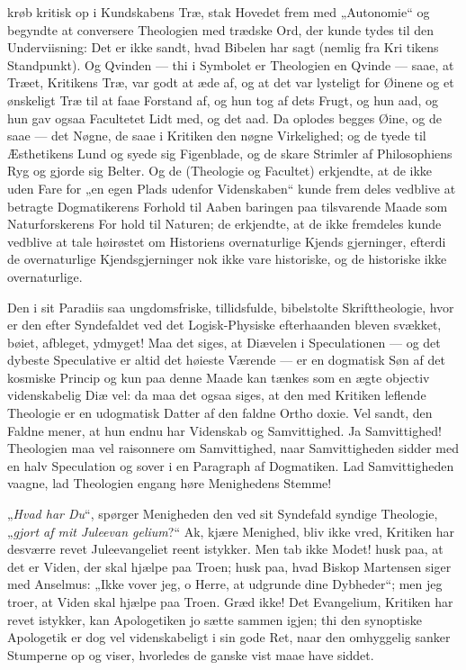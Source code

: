 \documentclass[12pt]{book}
\newcommand{\opage}[1]{\marginnote{\footnotesize\textit{[#1]}}}
\begin{document}
krøb kritisk op i Kundskabens Træ, stak Hovedet frem
med „Autonomie“ og begyndte at conversere Theologien
med trædske Ord, der kunde tydes til den Underviisning:
Det er ikke sandt, hvad Bibelen har sagt (nemlig fra Kri\-%
tikens Standpunkt). Og Qvinden --- thi i Symbolet er
Theologien en Qvinde --- saae, at Træet, Kritikens Træ,
var godt at æde af, og at det var lysteligt for Øinene og et
ønskeligt Træ til at faae Forstand af, og hun tog af dets
Frugt, og hun aad, og hun gav ogsaa Facultetet Lidt
med, og det aad. Da oplodes begges Øine, og de saae ---
det Nøgne, de saae i Kritiken den nøgne Virkelighed; og de
tyede til Æsthetikens Lund og syede sig Figenblade, og de
skare Strimler af Philosophiens Ryg og gjorde sig Belter.
Og de (Theologie og Facultet) erkjendte, at de ikke uden
Fare for „en egen Plads udenfor Videnskaben“ kunde frem\-%
deles vedblive at betragte Dogmatikerens Forhold til Aaben\-%
baringen paa tilsvarende Maade som Naturforskerens For\-%
hold til Naturen; de erkjendte, at de ikke fremdeles kunde
vedblive at tale høirøstet om Historiens overnaturlige Kjends\-%
gjerninger, efterdi de overnaturlige Kjendsgjerninger nok ikke
vare historiske, og de historiske ikke overnaturlige.

Den i sit Paradiis saa ungdomsfriske, tillidsfulde,
bibelstolte Skrifttheologie, hvor er den efter Syndefaldet ved
det Logisk-Physiske efterhaanden bleven svækket, bøiet, afbleget,
\opage{49}\setcounter{footnote}{0}%
ydmyget! Maa det siges, at Diævelen i Speculationen ---
og det dybeste Speculative er altid det høieste Værende --- er
en dogmatisk Søn af det kosmiske Princip og kun paa denne
Maade kan tænkes som en ægte objectiv videnskabelig Diæ\-%
vel: da maa det ogsaa siges, at den med Kritiken leflende
Theologie er en udogmatisk Datter af den faldne Ortho\-%
doxie. Vel sandt, den Faldne mener, at hun endnu har
Videnskab og Samvittighed. Ja Samvittighed! Theologien
maa vel raisonnere om Samvittighed, naar Samvittigheden
sidder med en halv Speculation og sover i en Paragraph
af Dogmatiken. Lad Samvittigheden vaagne, lad Theologien
engang høre Menighedens Stemme!

„\emph{Hvad har Du}“, spørger Menigheden den ved sit
Syndefald syndige Theologie, „\emph{gjort af mit Juleevan\-%
gelium}?“ Ak, kjære Menighed, bliv ikke vred, Kritiken har
desværre revet Juleevangeliet reent istykker. Men tab ikke
Modet! husk paa, at det er Viden, der skal hjælpe paa Troen;
husk paa, hvad Biskop Martensen siger med Anselmus: „Ikke
vover jeg, o Herre, at udgrunde dine Dybheder“; men jeg troer,
at Viden skal hjælpe paa Troen. Græd ikke! Det Evangelium,
Kritiken har revet istykker, kan Apologetiken jo sætte sammen
igjen; thi den synoptiske Apologetik er dog vel videnskabeligt
i sin gode Ret, naar den omhyggelig sanker Stumperne op
og viser, hvorledes de ganske vist maae have siddet.
\end{document}
